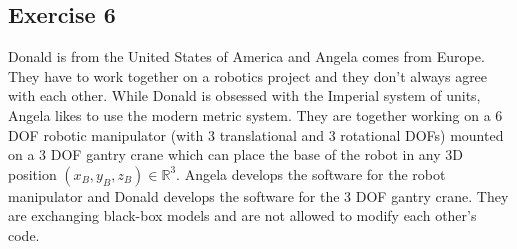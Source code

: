 \subsection{Exercise 6}
Donald is from the United States of America and Angela comes from Europe. They have to work together on a robotics project and they don't always agree with each other. While Donald is obsessed with the Imperial system of units, Angela likes to use the modern metric system. They are together working on a 6 DOF robotic manipulator (with 3 translational and 3 rotational DOFs) mounted on a 3 DOF gantry crane which can place the base of the robot in any 3D position $(x_B, y_B, z_B) \in \mathbb{R}^3$. Angela develops the software for the robot manipulator and Donald develops the software for the 3 DOF gantry crane. They are exchanging black-box models and are not allowed to modify each other's code.

